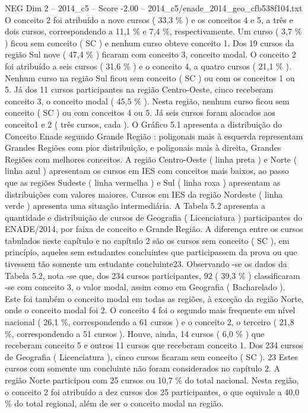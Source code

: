 \begin{textsample}{NEG Dim 2 – 2014\_c5 – Score -2.00 – 2014\_c5/enade\_2014\_geo\_cfb538f104.txt}
O conceito 2 foi atribuído a nove cursos ( 33,3 \% ) e os conceitos 4 e 5, a três e dois cursos, correspondendo a 11,1 \% e 7,4 \%, respectivamente.
Um curso ( 3,7 \% ) ficou sem conceito ( SC ) e nenhum curso obteve conceito 1.
Dos 19 cursos da região Sul nove ( 47,4 \% ) ficaram com conceito 3, conceito modal.
O conceito 2 foi atribuído a seis cursos ( 31,6 \% ) e o conceito 4, a quatro cursos ( 21,1 \% ).
Nenhum curso na região Sul ficou sem conceito ( SC ) ou com os conceitos 1 ou 5.
Já dos 11 cursos participantes na região Centro-Oeste, cinco receberam conceito 3, o conceito modal ( 45,5 \% ).
Nesta região, nenhum curso ficou sem conceito ( SC ) ou com conceitos 4 ou 5.
Já seis cursos foram alocados aos conceito1 e 2 ( três cursos, cada ).
O Gráfico 5.1 apresenta a distribuição do Conceito Enade segundo Grande Região : poligonais mais à esquerda representam Grandes Regiões com pior distribuição, e poligonais mais à direita, Grandes Regiões com melhores conceitos.
A região Centro-Oeste ( linha preta ) e Norte ( linha azul ) apresentam os cursos em IES com conceitos mais baixos, ao passo que as regiões Sudeste ( linha vermelha ) e Sul ( linha roxa ) apresentam as distribuições com valores maiores.
Cursos em IES da região Nordeste ( linha verde ) apresenta uma situação intermediária.
A Tabela 5.2 apresenta a quantidade e distribuição de cursos de Geografia ( Licenciatura ) participantes do ENADE/2014, por faixa de conceito e Grande Região.
A diferença entre os cursos tabulados neste capítulo e no capítulo 2 são os cursos sem conceito ( SC ), em princípio, aqueles sem estudantes concluintes que participassem da prova ou que tivessem tão somente um estudante concluinte23.
Observando -se os dados da Tabela 5.2, nota -se que, dos 234 cursos participantes, 92 ( 39,3 \% ) classificaram -se com conceito 3, o valor modal, assim como em Geografia ( Bacharelado ).
Este foi também o conceito modal em todas as regiões, à exceção da região Norte, onde o conceito modal foi 2.
O conceito 4 foi o segundo mais frequente em nível nacional ( 26,1 \%, correspondendo a 61 cursos ) e o conceito 2, o terceiro ( 21,8 \%, correspondendo a 51 cursos ).
Houve, ainda, 14 cursos ( 6,0 \% ) que receberam conceito 5 e outros 11 cursos que receberam conceito 1.
Dos 234 cursos de Geografia ( Licenciatura ), cinco cursos ficaram sem conceito ( SC ). 23 Estes cursos com somente um concluinte não foram considerados no capítulo 2.
A região Norte participou com 25 cursos ou 10,7 \% do total nacional.
Nesta região, o conceito 2 foi atribuído a dez cursos dos 25 participantes, o que equivale a 40,0 \% do total regional, além de ser o conceito modal na região.

\end{textsample}
